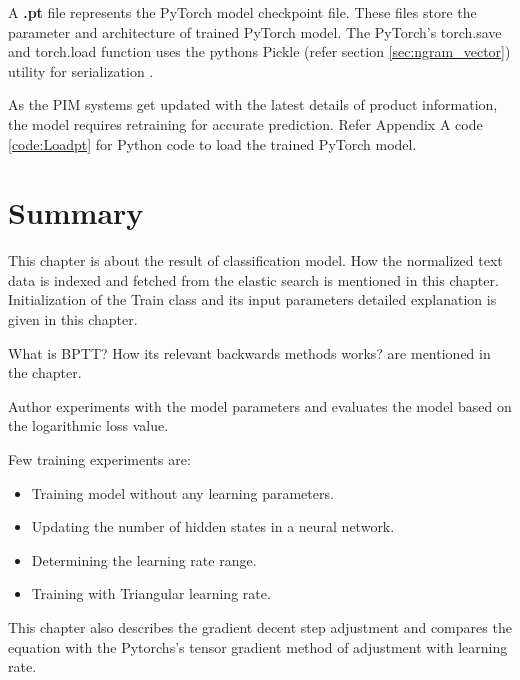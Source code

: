 A \textbf{.pt} file represents the PyTorch model checkpoint file. These files store the parameter and architecture of trained PyTorch model. The PyTorch's torch.save and torch.load function uses the pythons  Pickle (refer section \ref{sec:ngram_vector}) utility for serialization \parencite{savept}.

As the \acl{PIM} systems get updated with the latest details of product information, the model requires retraining for accurate prediction. Refer Appendix A code \ref{code:Loadpt} for Python code to load the trained PyTorch model.

\section{Summary}

This chapter is about the result of classification model. How the normalized text data is indexed and fetched from the elastic search is mentioned in this chapter. Initialization of the Train class and its input parameters detailed explanation is given in this chapter.  

What is \acf*{BPTT}? How its relevant backwards methods works? are mentioned in the chapter.

Author experiments with the model parameters and evaluates the model based on the logarithmic loss value. 

Few training experiments are:
\begin{itemize}
    \item Training model without any learning parameters.
    \item Updating the number of hidden states in a neural network.
    \item Determining the learning rate range.
    \item Training with Triangular learning rate.
\end{itemize}


This chapter also describes the gradient decent \parencite{cauchy} step adjustment and compares the equation with the Pytorchs's tensor gradient method of adjustment with learning rate.  